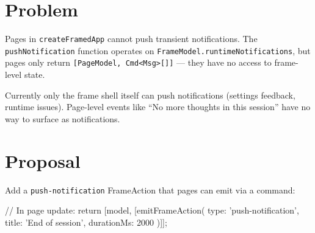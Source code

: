 \section{Problem}\label{record-350-problem}

Pages in \texttt{c\allowbreak{}r\allowbreak{}e\allowbreak{}a\allowbreak{}t\allowbreak{}e\allowbreak{}F\allowbreak{}r\allowbreak{}a\allowbreak{}m\allowbreak{}e\allowbreak{}d\allowbreak{}A\allowbreak{}p\allowbreak{}p} cannot push transient notifications. The \texttt{p\allowbreak{}u\allowbreak{}s\allowbreak{}h\allowbreak{}N\allowbreak{}o\allowbreak{}t\allowbreak{}i\allowbreak{}f\allowbreak{}i\allowbreak{}c\allowbreak{}a\allowbreak{}t\allowbreak{}i\allowbreak{}o\allowbreak{}n} function operates on \texttt{F\allowbreak{}r\allowbreak{}a\allowbreak{}m\allowbreak{}e\allowbreak{}M\allowbreak{}o\allowbreak{}d\allowbreak{}e\allowbreak{}l\allowbreak{}.\allowbreak{}r\allowbreak{}u\allowbreak{}n\allowbreak{}t\allowbreak{}i\allowbreak{}m\allowbreak{}e\allowbreak{}N\allowbreak{}o\allowbreak{}t\allowbreak{}i\allowbreak{}f\allowbreak{}i\allowbreak{}c\allowbreak{}a\allowbreak{}t\allowbreak{}i\allowbreak{}o\allowbreak{}n\allowbreak{}s}, but pages only return \texttt{[\allowbreak{}P\allowbreak{}a\allowbreak{}g\allowbreak{}e\allowbreak{}M\allowbreak{}o\allowbreak{}d\allowbreak{}e\allowbreak{}l\allowbreak{},\allowbreak{} \allowbreak{}C\allowbreak{}m\allowbreak{}d\allowbreak{}<\allowbreak{}M\allowbreak{}s\allowbreak{}g\allowbreak{}>\allowbreak{}[\allowbreak{}]\allowbreak{}]} --- they have no access to frame-level state.

Currently only the frame shell itself can push notifications (settings feedback, runtime issues). Page-level events like ``No more thoughts in this session'' have no way to surface as notifications.

\section{Proposal}\label{record-350-proposal}

Add a \texttt{p\allowbreak{}u\allowbreak{}s\allowbreak{}h\allowbreak{}-\allowbreak{}n\allowbreak{}o\allowbreak{}t\allowbreak{}i\allowbreak{}f\allowbreak{}i\allowbreak{}c\allowbreak{}a\allowbreak{}t\allowbreak{}i\allowbreak{}o\allowbreak{}n} FrameAction that pages can emit via a command:

\begin{CodeBlock}
// In page update:
return [model, [emitFrameAction({ type: 'push-notification', title: 'End of session', durationMs: 2000 })]];
\end{CodeBlock}

